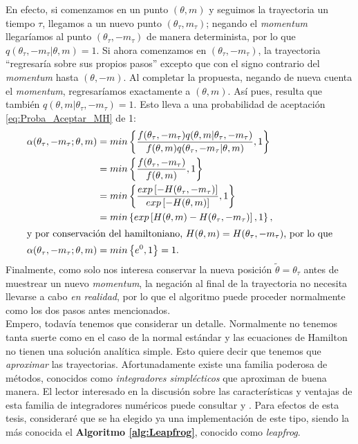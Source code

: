 En efecto, si comenzamos en un punto $(\theta,m)$ y seguimos la trayectoria un tiempo $\tau$, llegamos a un nuevo punto $(\theta_\tau,m_\tau)$; negando el \textit{momentum} llegaríamos al punto $(\theta_\tau,-m_\tau)$ de manera determinista, por lo que  $q(\theta_\tau,-m_\tau|\theta,m) = 1$. Si ahora comenzamos en $(\theta_\tau,-m_\tau)$, la trayectoria ``regresaría sobre sus propios pasos'' excepto que con el signo contrario del \textit{momentum} hasta $(\theta,-m)$. Al completar la propuesta, negando de nueva cuenta el \textit{momentum}, regresaríamos exactamente a $(\theta,m)$. Así pues, resulta que también $q(\theta,m|\theta_\tau,-m_\tau) = 1$. Esto lleva a una probabilidad de aceptación \eqref{eq:Proba_Aceptar_MH} de 1:
\begin{align}
\alpha(\theta_\tau,-m_\tau;\theta,m) &= min\left\lbrace\dfrac{f(\theta_\tau,-m_\tau)q(\theta,m|\theta_\tau,-m_\tau)}{f(\theta,m)q(\theta_\tau,-m_\tau|\theta,m)},1\right\rbrace \nonumber \\
&= min\left\lbrace\dfrac{f(\theta_\tau,-m_\tau)}{f(\theta,m)},1\right\rbrace \nonumber\\
&= min\left\lbrace\dfrac{exp\left[ -H(\theta_\tau,-m_\tau)\right]}{exp\left[ -H(\theta,m)\right]},1\right\rbrace \nonumber\\
&= min\left\lbrace exp\left[ H(\theta,m)-H(\theta_\tau,-m_\tau)\right],1\right\rbrace, \nonumber\\
\intertext{y por conservación del hamiltoniano, $H(\theta,m)=H(\theta_\tau,-m_\tau)$, por lo que}
\alpha(\theta_\tau,-m_\tau;\theta,m)&= min\left\lbrace e^0,1\right\rbrace = 1.
\label{eq:Proba_Acepta_HMC_ideal}
\end{align}
Finalmente, como solo nos interesa conservar la nueva posición $\tilde{\theta}=\theta_\tau$ antes de muestrear un nuevo \textit{momentum}, la negación al final de la trayectoria no necesita llevarse a cabo \textit{en realidad}, por lo que el algoritmo puede proceder normalmente como los dos pasos antes mencionados.\\

Empero, todavía tenemos que considerar un detalle. Normalmente no tenemos tanta suerte como en el caso de la normal estándar y las ecuaciones de Hamilton no tienen una solución analítica simple. Esto quiere decir que tenemos que \textit{aproximar} las trayectorias. Afortunadamente existe una familia poderosa de métodos, conocidos como \textit{integradores simplécticos} que aproximan de buena manera. El lector interesado en la discusión sobre las características y ventajas de esta familia de integradores numéricos puede consultar \textcite{Betancourt17} y \textcite{Neal93}. Para efectos de esta tesis, consideraré que se ha elegido ya una implementación de este tipo, siendo la más conocida el \textbf{Algoritmo \ref{alg:Leapfrog}}, conocido como \textit{leapfrog}. \\

